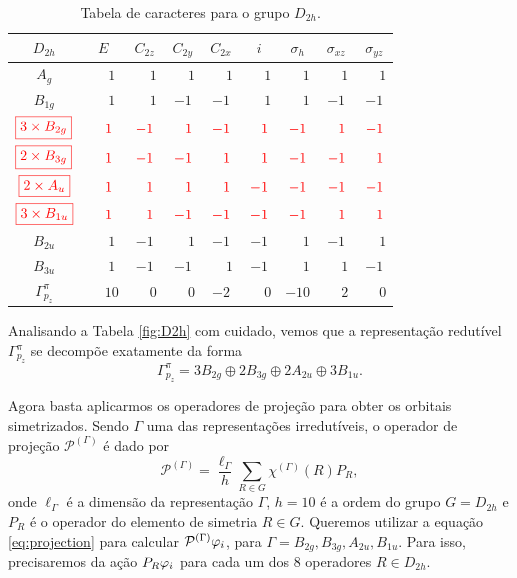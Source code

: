 \documentclass[a4paper,10pt]{article}
\renewcommand{\p}{\phantom{+}}
\renewcommand{\c}[1]{\textcolor{red}{#1}}
\begin{document}
\begin{table}[H]
\caption{Tabela de caracteres para o grupo $D_{2h}$.}
\centering

\begin{tabular} { |c|c c c c c c c c | }
\hline
$D_{2h}$ & $E$ & $C_{2z}$ & $C_{2y}$ & $C_{2x}$ & $i$ & $\sigma_{h}$ & $\sigma_{xz}$ & $\sigma_{yz}$ \\
\hline
$A_{g}$                      & $\p1$ & $\p1$ & $\p1$ & $\p1$ & $\p1$ & $\p1$ & $\p1$ & $\p1$ \\
$B_{1g}$                     & $\p1$ & $\p1$ & $ -1$ & $ -1$ & $\p1$ & $\p1$ & $ -1$ & $ -1$ \\
$\c{\boxed{3\times B_{2g}}}$ & $\c{\p1}$ & $\c{ -1}$ & $\c{\p1}$ & $\c{ -1}$ & $\c{\p1}$ & $\c{ -1}$ & $\c{\p1}$ & $\c{ -1}$ \\
$\c{\boxed{2\times B_{3g}}}$ & $\c{\p1}$ & $\c{ -1}$ & $\c{ -1}$ & $\c{\p1}$ & $\c{\p1}$ & $\c{ -1}$ & $\c{ -1}$ & $\c{\p1}$ \\
$\c{\boxed{2\times A_{u}}}$  & $\c{\p1}$ & $\c{\p1}$ & $\c{\p1}$ & $\c{\p1}$ & $\c{ -1}$ & $\c{ -1}$ & $\c{ -1}$ & $\c{ -1}$ \\
$\c{\boxed{3\times B_{1u}}}$ & $\c{\p1}$ & $\c{\p1}$ & $\c{ -1}$ & $\c{ -1}$ & $\c{ -1}$ & $\c{ -1}$ & $\c{\p1}$ & $\c{\p1}$ \\
$B_{2u}$                     & $\p1$ & $ -1$ & $\p1$ & $ -1$ & $ -1$ & $\p1$ & $ -1$ & $\p1$ \\
$B_{3u}$                     & $\p1$ & $ -1$ & $ -1$ & $\p1$ & $ -1$ & $\p1$ & $\p1$ & $ -1$ \\
\hline
\hline
$\Gamma_{p_z}^\pi$ & $\p10$ & $\p0$ & $\p0$ & $ -2$ & $\p0$ & $-10$ & $\p2$ & $\p0$ \\
\hline
\end{tabular}

\label{tab:mult_D2h}
\end{table}

Analisando a Tabela \ref{fig:D2h} com cuidado, vemos que a representação redutível $\Gamma^\pi_{p_z}$ se decompõe exatamente da forma
$$
\boxed{ \Gamma^\pi_{p_z} = 3 B_{2g} \oplus 2 B_{3g} \oplus 2 A_{2u} \oplus 3 B_{1u}. }
$$

Agora basta aplicarmos os operadores de projeção para obter os orbitais simetrizados. Sendo $\Gamma$ uma das representações irredutíveis, o operador de projeção $\mathcal{P}^{(\Gamma)}$ é dado por
\begin{equation} \label{eq:projection}
\mathcal{P}^{(\Gamma)} = \frac{\ell_{\Gamma}}{h} \sum_{R \in G} \chi^{(\Gamma)}(R) P_R,
\end{equation}
onde $\ell_\Gamma$ é a dimensão da representação $\Gamma$, $h = 10$ é a ordem do grupo $G = D_{2h}$ e $P_R$ é o operador do elemento de simetria $R \in G$. Queremos utilizar a equação \ref{eq:projection} para calcular $\mathcal{P}^{(\Gamma)} \varphi_i$, para $\Gamma = B_{2g}, B_{3g}, A_{2u}, B_{1u}$. Para isso, precisaremos da ação $P_R \varphi_i$ para cada um dos 8 operadores $R \in D_{2h}$.
\end{document}
